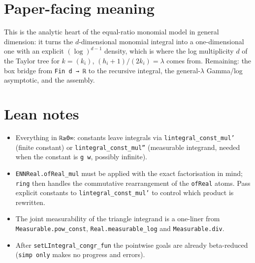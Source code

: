 \documentclass[11pt]{article}
\begin{document}
\section{Paper-facing meaning}
This is the analytic heart of the equal-ratio monomial model in general dimension: it turns the
$d$-dimensional monomial integral into a one-dimensional one with an explicit $(\log)^{d-1}$ density,
which is where the log multiplicity $d$ of the Taylor tree for $k=(k_i)$, $(h_i+1)/(2k_i)=\lambda$
comes from. Remaining: the box bridge from \texttt{Fin d → ℝ} to the recursive integral, the
general-$\lambda$ Gamma/log asymptotic, and the assembly.

\section{Lean notes}
\begin{itemize}
\item Everything in \texttt{ℝ≥0∞}: constants leave integrals via \texttt{lintegral\_const\_mul'}
(finite constant) or \texttt{lintegral\_const\_mul''} (measurable integrand, needed when the constant
is \texttt{g w}, possibly infinite).
\item \texttt{ENNReal.ofReal\_mul} must be applied with the exact factorisation in mind;
\texttt{ring} then handles the commutative rearrangement of the \texttt{ofReal} atoms. Pass explicit
constants to \texttt{lintegral\_const\_mul'} to control which product is rewritten.
\item The joint measurability of the triangle integrand is a one-liner from \texttt{Measurable.pow\_const},
\texttt{Real.measurable\_log} and \texttt{Measurable.div}.
\item After \texttt{setLIntegral\_congr\_fun} the pointwise goals are already beta-reduced
(\texttt{simp only} makes no progress and errors).
\end{itemize}
\end{document}
